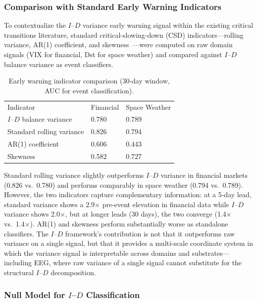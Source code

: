 \documentclass[aip,cha,reprint,amsmath,amssymb,final,floatfix]{revtex4-2}
\begin{document}
\subsubsection{Comparison with Standard Early Warning Indicators}

To contextualize the $I$--$D$ variance early warning signal within the existing critical transitions literature, standard critical-slowing-down (CSD) indicators---rolling variance, AR(1) coefficient, and skewness~\cite{dakos2012}---were computed on raw domain signals (VIX for financial, Dst for space weather) and compared against $I$--$D$ balance variance as event classifiers.

\begin{table}[!htbp]
\caption[Early warning indicator comparison showing AUC for event classification across methods]{\label{tab:ews}Early warning indicator comparison (30-day window, AUC for event classification).}
\begin{ruledtabular}
\begin{tabular}{lll}
Indicator & Financial & Space Weather \\
$I$--$D$ balance variance & 0.780 & 0.789 \\
Standard rolling variance & 0.826 & 0.794 \\
AR(1) coefficient & 0.606 & 0.443 \\
Skewness & 0.582 & 0.727 \\
\end{tabular}
\end{ruledtabular}
\end{table}

Standard rolling variance slightly outperforms $I$--$D$ variance in financial markets (0.826 vs.\ 0.780) and performs comparably in space weather (0.794 vs.\ 0.789). However, the two indicators capture complementary information: at a 5-day lead, standard variance shows a 2.9$\times$ pre-event elevation in financial data while $I$--$D$ variance shows 2.0$\times$, but at longer leads (30 days), the two converge (1.4$\times$ vs.\ 1.4$\times$). AR(1) and skewness perform substantially worse as standalone classifiers. The $I$--$D$ framework's contribution is not that it outperforms raw variance on a single signal, but that it provides a multi-scale coordinate system in which the variance signal is interpretable across domains and substrates---including EEG, where raw variance of a single signal cannot substitute for the structural $I$--$D$ decomposition.

\subsubsection{Null Model for $I$--$D$ Classification}
\end{document}
